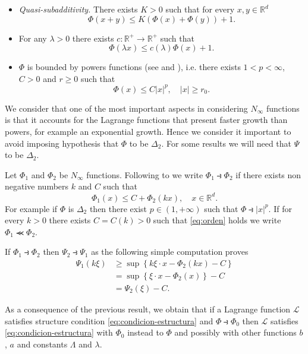 \documentclass[twoside]{article}
\theoremstyle{remark}
\newcommand{\rr}{\mathbb{R}}
\renewcommand{\leq}{\leqslant}
\renewcommand{\geq}{\geqslant}
\newcounter{example}[section]
\begin{document}
\begin{itemize}
 \item \emph{Quasi-subadditivity.} There exists $K>0$ such that for every $x,y\in \rr^d$
\begin{equation}\label{eq:quasi-sub-aditividad}
\Phi(x+y)\leq K (\Phi(x)+\Phi(y))+1.
\end{equation}
\item  For any $\lambda>0$ there exists $c:\rr^+\to \rr^+$ such that
\begin{equation}\label{eq:delta2-lambda}
\Phi(\lambda x)\leq c(\lambda)\Phi(x)+1.
\end{equation}
\item $\Phi$ is bounded by powers functions (see \cite[Proof Lemma 2.4]{Desch2001} and \cite[Prop. 1]{cianchi2000local}), i.e. there exists $1<p<\infty$, $C>0$ and $r\geq 0$ such that
\[\Phi(x)\leq C|x|^p,\quad |x|\geq r_0.\]

\end{itemize}

We consider that one of the most important aspects in considering $N_{\infty}$ functions is that it accounts for the Lagrange functions that present faster growth than powers, for example an exponential growth. Hence we consider it important to avoid imposing hypothesis that $\Phi$ to be $\Delta_2$. For some results we will need that $\Psi$ to be $\Delta_2$. 


Let $\Phi_1$ and $\Phi_2$ be   $N_{\infty}$ functions. Following to \cite{trudinger1974imbedding} we write $\Phi_1\strictif\Phi_2$ if there exists non negative numbers $k$ and $C$ such that
\begin{equation}\label{eq:orden} \Phi_1(x)\leq C+\Phi_2(kx),\quad x\in\rr^d.\end{equation}
For example if $\Phi$ is $\Delta_2$ then there exist $p\in (1,+\infty)$ such that $\Phi\strictif |x|^p$.  If for every $k>0$ there exists $C=C(k)>0$ such that \eqref{eq:orden} holds we write  $\Phi_1\llcurly\Phi_2$. 

If $\Phi_1\strictif \Phi_2$ then $\Psi_2\strictif\Psi_1$ as the following simple computation proves 
\[
\begin{split}
  \Psi_1(k\xi)&\geq \sup \left\{k\xi\cdot x-\Phi_2(kx)-C\right\}\\
&=\sup \left\{\xi\cdot x-\Phi_2(x)\right\}-C\\
&=\Psi_2\left(\xi\right)-C.
\end{split}
\]


As a consequence of the previous result, we obtain that if a Lagrange function $\mathcal{L}$ satisfies structure condition \eqref{eq:condicion-estructura} and $\Phi\strictif \Phi_0$ then $\mathcal{L}$ satisfies \eqref{eq:condicion-estructura} with $\Phi_0$ instead to $\Phi$ and possibly with other functions $b$, $a$ and constants $\Lambda$ and $\lambda$.
\end{document}
